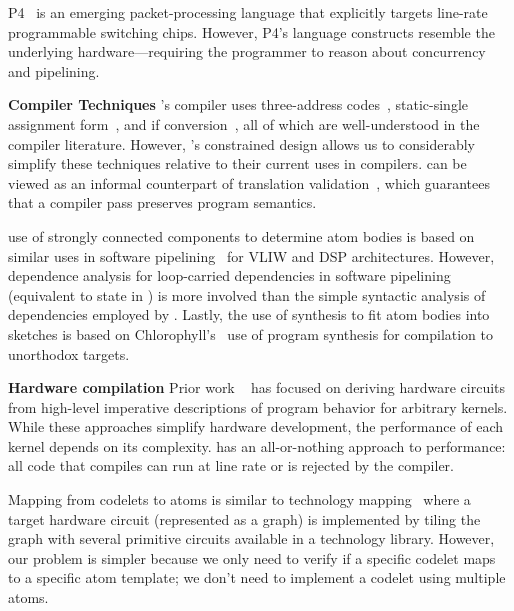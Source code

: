 P4~\cite{p4} is an emerging packet-processing language that explicitly targets
line-rate programmable switching chips. However, P4's language constructs
resemble the underlying hardware---requiring the programmer to reason about
concurrency and pipelining.

\textbf{Compiler Techniques}
\pktlanguage's compiler uses three-address codes~\cite{tac}, static-single
assignment form~\cite{ssa}, and if conversion~\cite{if_conversion}, all of
which are well-understood in the compiler literature. However, \pktlanguage's
constrained design allows us to considerably simplify these techniques relative
to their current uses in compilers. \tester can be viewed as an informal
counterpart of translation validation~\cite{necula_translation_validation},
which guarantees that a compiler pass preserves program semantics.

\pktlanguage use of strongly connected components to determine atom bodies is
based on similar uses in software pipelining~\cite{software_pipelining} for
VLIW and DSP architectures. However, dependence analysis for loop-carried
dependencies in software pipelining (equivalent to state in \pktlanguage) is
more involved than the simple syntactic analysis of dependencies employed by
\pktlanguage. Lastly, the use of synthesis to fit atom bodies into sketches is
based on Chlorophyll's~\cite{chlorophyll} use of program synthesis for
compilation to unorthodox targets.

\textbf{Hardware compilation}
Prior work ~\cite{nurvadathi, cash, bluespec} has focused on deriving hardware
circuits from high-level imperative descriptions of program behavior for
arbitrary kernels. While these approaches simplify hardware development, the
performance of each kernel depends on its complexity.  \pktlanguage has an
all-or-nothing approach to performance: all code that compiles can run at
line rate or is rejected by the compiler.

Mapping from codelets to atoms is similar to technology mapping~\cite{micheli,
flowmap, spectransform} where a target hardware circuit (represented as a
graph) is implemented by tiling the graph with several primitive circuits
available in a technology library. However, our problem is simpler because we
only need to verify if a specific codelet maps to a specific atom template; we
don't need to implement a codelet using multiple atoms.
